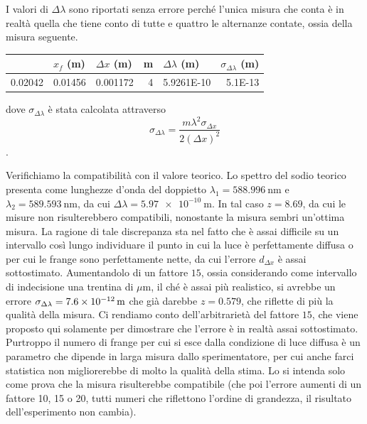 \documentclass[a4paper,11pt]{article}
\begin{document}
I valori di $\Delta \lambda$ sono riportati senza errore perché l'unica misura che conta è in realtà quella che tiene conto di tutte e quattro le alternanze contate, ossia della misura seguente.

\begin{table}[htbp]
	\centering
	\begin{tabular}{rrrrrr}
		\bottomrule
		\rowcolor[rgb]{ .267,  .447,  .769} \multicolumn{1}{l}{\textcolor[rgb]{ 1,  1,  1}{\textbf{$x _i$ (m)}}} & \multicolumn{1}{l}{\textcolor[rgb]{ 1,  1,  1}{\textbf{$x _f$ (m)}}} & \multicolumn{1}{l}{\textcolor[rgb]{ 1,  1,  1}{\textbf{$\Delta x$ (m)}}} & \multicolumn{1}{l}{\textcolor[rgb]{ 1,  1,  1}{\textbf{m}}} & \multicolumn{1}{l}{\textcolor[rgb]{ 1,  1,  1}{\textbf{$\Delta \lambda$ (m)}}} & \multicolumn{1}{l}{\textcolor[rgb]{ 1,  1,  1}{\textbf{$\sigma _{\Delta \lambda}$ (m)}}} \\
		\toprule
		0.02042 & 0.01456 & 0.001172 & 4     & 5.9261E-10 & 5.1E-13 \\
		\toprule
	\end{tabular}%
\end{table}%

dove $\sigma _{\Delta \lambda}$ è stata calcolata attraverso $$\sigma _{\Delta \lambda} = \frac{m \lambda^2 \sigma _{\Delta x}}{2 (\Delta x) ^2}$$.

Verifichiamo la compatibilità con il valore teorico. Lo spettro del sodio teorico presenta come lunghezze d'onda del doppietto $\lambda _1 = \SI{588.996}{\nano \meter}$ e $\lambda _2 = \SI{589.593}{\nano \meter}$, da cui $\Delta \lambda = \SI{5.97e-10}{\meter}$. In tal caso $z = 8.69$, da cui le misure non risulterebbero compatibili, nonostante la misura sembri un'ottima misura. La ragione di tale discrepanza sta nel fatto che è assai difficile su un intervallo così lungo individuare il punto in cui la luce è perfettamente diffusa o per cui le frange sono perfettamente nette, da cui l'errore $d_{\Delta x}$ è assai sottostimato. Aumentandolo di un fattore $15$, ossia considerando come intervallo di indecisione una trentina di $\mu \text{m}$, il ché è assai più realistico, si avrebbe un errore $\sigma _{\Delta \lambda} = \SI{7.6E-12}{\meter}$ che già darebbe $z = 0.579$, che riflette di più la qualità della misura. Ci rendiamo conto dell'arbitrarietà del fattore $15$, che viene proposto qui solamente per dimostrare che l'errore è in realtà assai sottostimato. Purtroppo il numero di frange per cui si esce dalla condizione di luce diffusa è un parametro che dipende in larga misura dallo sperimentatore, per cui anche farci statistica non migliorerebbe di molto la qualità della stima. Lo si intenda solo come prova che la misura risulterebbe compatibile (che poi l'errore aumenti di un fattore 10, 15 o 20, tutti numeri che riflettono l'ordine di grandezza, il risultato dell'esperimento non cambia).
\end{document}
